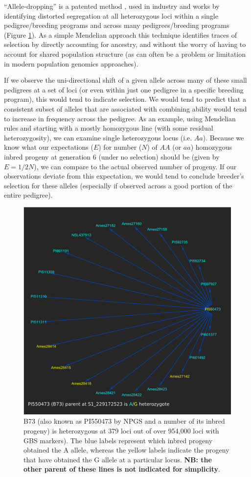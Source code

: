 \documentclass[final,12pt]{article}
\begin{document}
``Allele-dropping'' is a patented method \citep{sebastian1995method}, used in industry and works by identifying distorted segregation at all heterozygous loci within a single pedigree/breeding programs and across many pedigrees/breeding programs (Figure \ref{fig:alleledrop}). 
As a simple Mendelian approach this technique identifies traces of selection by directly accounting for ancestry, and without the worry of having to account for shared population structure \cite{sebastian1995method} (as can often be a problem or limitation in modern population genomics approaches). 

If we observe the uni-directional shift of a given allele across many of these small pedigrees at a set of loci (or even within just one pedigree in a specific breeding program), this would tend to indicate selection. 
We would tend to predict that a consistent subset of alleles that are associated with combining ability would tend to increase in frequency across the pedigree.
As an example, using Mendelian rules and starting with a mostly homozygous line (with some residual heterozygosity), we can examine single heterozygous locus (i.e. $Aa$). 
Because we know what our expectations ($E$) for number ($N$) of $AA$ (or $aa$) homozygous inbred progeny at generation 6 (under no selection) should be (given by $E = 1/2 N$), we can compare to the actual observed number of progeny. 
If our observations deviate from this expectation, we would tend to conclude breeder's selection for these alleles (especially if observed across a good portion of the entire pedigree). 

\begin{figure}
\includegraphics[width=0.5\linewidth]{Pruned.pdf}
\caption{B73 (also known as PI550473 by NPGS and a number of its inbred progeny) is heterozygous at 379 loci out of over 954,000 loci with GBS markers). The blue labels represent which inbred progeny obtained the A allele, whereas the yellow labels indicate the progeny that have obtained the G allele at a particular locus. \textbf{NB: the other parent of these lines is not indicated for simplicity}.}
\label{fig:alleledrop}
\end{figure}
\end{document}
